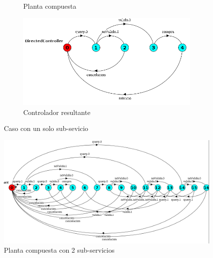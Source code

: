 \begin{figure}[htb]
\begin{center}
{\begin{subfigure}[t]{.5\textwidth}
		\caption{Planta compuesta}
		\label{fig:N1Planta}
	\end{subfigure}
	\begin{subfigure}[t]{.5\textwidth}
	\centering
	\includegraphics[width=\linewidth]{figures/ejemploServicios/N1Controlador.png}  
	\caption{Controlador resultante}
	\label{fig:controladorN1}
	\end{subfigure}
	}
	\caption{Caso con un solo sub-sevicio}
	\label{fig:N1}
	\end{center}
\end{figure}


\begin{figure}[htb]
	\includegraphics[width=\linewidth]{figures/ejemploServicios/N2Planta.png}  
	\caption{Planta compuesta con 2 sub-servicios}
	\label{fig:N2}
\end{figure}

















